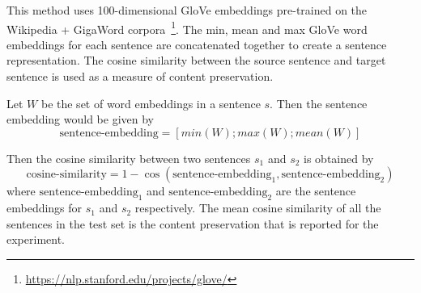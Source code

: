 This method uses 100-dimensional GloVe embeddings \citep{pennington2014glove} pre-trained on the Wikipedia + GigaWord corpora~\footnote{\url{https://nlp.stanford.edu/projects/glove/}}. The min, mean and max GloVe word embeddings for each sentence are concatenated together to create a sentence representation. The cosine similarity between the source sentence and target sentence is used as a measure of content preservation.

Let $W$ be the set of word embeddings in a sentence $s$. Then the sentence embedding would be given by
\begin{equation*}
	\text{sentence-embedding} = [min(W);max(W);mean(W)]
\end{equation*}

Then the cosine similarity between two sentences $s_1$ and $s_2$ is obtained by
\begin{equation*}
	\text{cosine-similarity} = 1 - \cos(\text{sentence-embedding}_1, \text{sentence-embedding}_2)
\end{equation*}
where $\text{sentence-embedding}_1$ and $\text{sentence-embedding}_2$ are the sentence embeddings for $s_1$ and $s_2$ respectively. The mean cosine similarity of all the sentences in the test set is the content preservation that is reported for the experiment.

